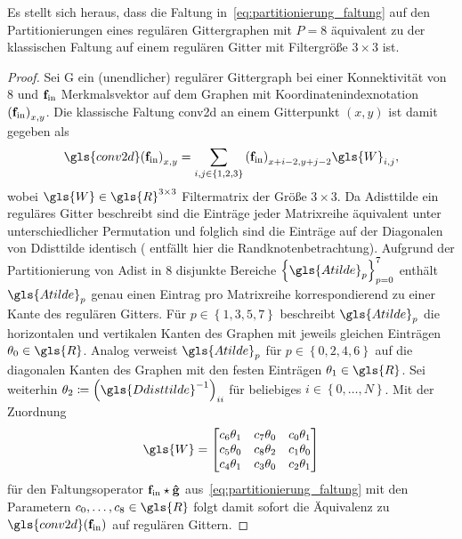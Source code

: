Es stellt sich heraus, dass die Faltung in~\eqref{eq:partitionierung_faltung} auf den Partitionierungen eines regulären Gittergraphen mit $P=8$ äquivalent zu der klassischen Faltung auf einem regulären Gitter mit Filtergröße $3 \times 3$ ist.
\begin{proof}
Sei \gls{G} ein (unendlicher) regulärer Gittergraph bei einer Konnektivität von $8$ und $\mathbf{f}_{\mathrm{in}}$ Merkmalsvektor auf dem Graphen mit Koordinatenindexnotation ${\left(\ve{f}_{\mathrm{in}}\right)}_{x,y}$.
  Die klassische Faltung \gls{conv2d} an einem Gitterpunkt $\left(x, y\right)$ ist damit gegeben als
\begin{equation*}
  {\gls{conv2d}\left({\ve{f}_{\mathrm{in}}}\right)}_{x,y} = \sum_{i,j \in \left\{1, 2, 3\right\}} {\left(\ve{f}_{\mathrm{in}}\right)}_{x+i-2, y+j-2} \gls{W}_{i, j},
\end{equation*}
wobei $\gls{W} \in \gls{R}^{3 \times 3}$ Filtermatrix der Größe $3 \times 3$.
Da \gls{Adisttilde} ein reguläres Gitter beschreibt sind die Einträge jeder Matrixreihe äquivalent unter unterschiedlicher Permutation und folglich sind die Einträge auf der Diagonalen von \gls{Ddisttilde} identisch (\oBdA{} entfällt hier die Randknotenbetrachtung).
Aufgrund der Partitionierung von \gls{Adist} in $8$ disjunkte Bereiche ${\left\{\gls{Atilde}_p\right\}}_{p=0}^7$ enthält $\gls{Atilde}_p$ genau einen Eintrag pro Matrixreihe korrespondierend zu einer Kante des regulären Gitters.
Für $p \in \left\{1, 3, 5, 7\right\}$ beschreibt $\gls{Atilde}_p$ die horizontalen und vertikalen Kanten des Graphen mit jeweils gleichen Einträgen $\theta_0 \in \gls{R}$.
Analog verweist $\gls{Atilde}_p$ für $p \in \left\{0, 2, 4, 6\right\}$ auf die diagonalen Kanten des Graphen mit den festen Einträgen $\theta_1 \in \gls{R}$.
Sei weiterhin \oBdA{} $\theta_2 \coloneqq {\left(\gls{Ddisttilde}^{-1}\right)}_{ii}$ für beliebiges $i \in \left\{0, \ldots, N\right\}$.
Mit der Zuordnung
\begin{equation*}
  \gls{W} = \begin{bmatrix}
    c_6\theta_1 & c_7\theta_0 & c_0\theta_1\\
    c_5\theta_0 & c_8\theta_2 & c_1\theta_0\\
    c_4\theta_1 & c_3\theta_0 & c_2\theta_1
  \end{bmatrix}
\end{equation*}
für den Faltungsoperator $\mathbf{f}_{\mathrm{in}} \star \mathbf{\hat g}$ aus~\eqref{eq:partitionierung_faltung} mit den Parametern $c_0, \ldots, c_8 \in \gls{R}$
folgt damit sofort die Äquivalenz zu $\gls{conv2d}\left(\ve{f}_{\mathrm{in}}\right)$ auf regulären Gittern.
\end{proof}


